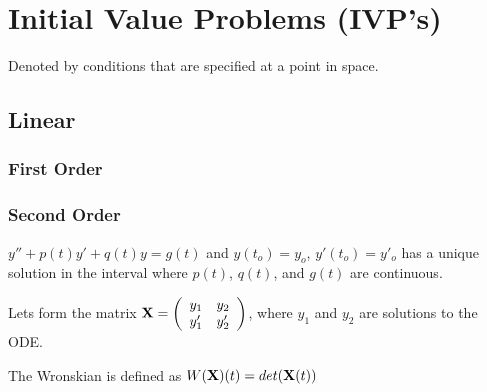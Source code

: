 \documentclass[a4paper,12pt]{article}
\begin{document}
\section{Initial Value Problems (IVP's)}
Denoted by conditions that are specified at a point in space.
\subsection{Linear}
	\subsubsection{First Order}
	\subsubsection{Second Order}
		
		$y''+p(t)y'+q(t)y=g(t)$ and $y(t_o)=y_o$, $y'(t_o)=y'_o$ has a unique solution in the interval where $p(t)$, $q(t)$, and $g(t)$ are continuous.
		
		Lets form the matrix $\bold{X}= \left( \begin{array}{cc}
y_1 & y_2 \\
y'_1 & y'_2 \\
 \end{array} \right)$, where $y_1$ and $y_2$ are solutions to the ODE. 
 
 The Wronskian is defined as $W(\bold{X})(t)=det(\bold{X}(t))$
		
\end{document}
